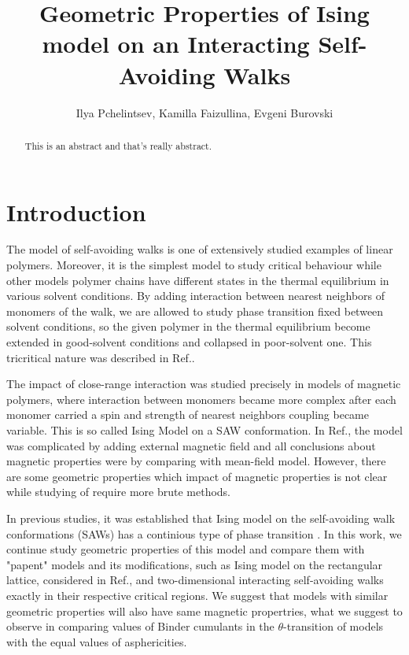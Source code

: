 \documentclass[a4paper]{jpconf}
\begin{document}
\title{Geometric Properties of Ising model on an Interacting Self-Avoiding Walks}

\author{Ilya Pchelintsev, Kamilla Faizullina, Evgeni Burovski}
%
\address{HSE University, 101000 Moscow, Russia}



\begin{abstract}
    This is an abstract and that's really abstract.
\end{abstract}

\section{Introduction}

The model of self-avoiding walks is one of extensively studied examples of linear polymers. Moreover, it is the simplest model to study critical behaviour while other models polymer chains have different states in the thermal equilibrium in various solvent conditions. By adding interaction between nearest neighbors of monomers of the walk, we are allowed to study phase transition fixed between solvent conditions, so the given polymer in the thermal equilibrium become extended in good-solvent conditions and collapsed in poor-solvent one. This tricritical nature was described in Ref.\cite{Gennes1979}.

The impact of close-range interaction was studied precisely in models of magnetic polymers, where interaction between monomers became more complex after each monomer carried a spin and strength of nearest neighbors coupling became variable. This is so called Ising Model on a SAW conformation. In Ref.\cite{Garel1999}, the model was complicated by adding external magnetic field and all conclusions about magnetic properties were by comparing with mean-field model. However, there are some geometric properties which impact of magnetic properties is not clear while studying of require more brute methods. 

In previous studies, it was established that Ising model on the self-avoiding walk conformations (SAWs) has a continious type of phase transition \cite{faizullina2021critical}. In this work, we continue study geometric properties of this model and compare them with "papent" models and its modifications, such as Ising model on the rectangular lattice, considered in Ref.\cite{Selke2006}, and two-dimensional interacting self-avoiding walks exactly in their respective critical regions. We suggest that models with similar geometric properties will also have same magnetic propertries, what we suggest to observe in comparing values of Binder cumulants in the $\theta$-transition of models with the equal values of asphericities.
\end{document}
